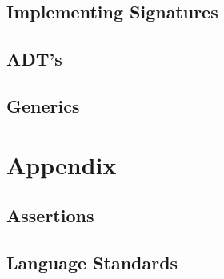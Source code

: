 \subsection*{Implementing Signatures}
\subsection*{ADT's}
\subsection*{Generics}

\section{Appendix}
\subsection*{Assertions}
\subsection*{Language Standards}
